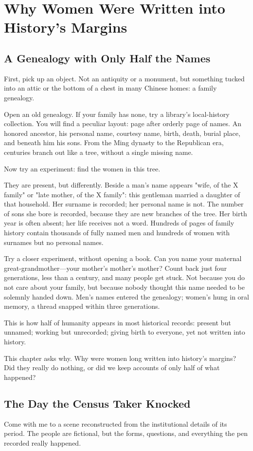 \chapter[Women in History's Margins]{Why Women Were Written into History's Margins}
\section{A Genealogy with Only Half the Names}
First, pick up an object. Not an antiquity or a monument, but something tucked into an attic or the bottom of a chest in many Chinese homes: a family genealogy.

Open an old genealogy. If your family has none, try a library's local-history collection. You will find a peculiar layout: page after orderly page of names. An honored ancestor, his personal name, courtesy name, birth, death, burial place, and beneath him his sons. From the Ming dynasty to the Republican era, centuries branch out like a tree, without a single missing name.

Now try an experiment: find the women in this tree.

They are present, but differently. Beside a man's name appears "wife, of the X family" or "late mother, of the X family": this gentleman married a daughter of that household. Her surname is recorded; her personal name is not. The number of sons she bore is recorded, because they are new branches of the tree. Her birth year is often absent; her life receives not a word. Hundreds of pages of family history contain thousands of fully named men and hundreds of women with surnames but no personal names.

Try a closer experiment, without opening a book. Can you name your maternal great-grandmother---your mother's mother's mother? Count back just four generations, less than a century, and many people get stuck. Not because you do not care about your family, but because nobody thought this name needed to be solemnly handed down. Men's names entered the genealogy; women's hung in oral memory, a thread snapped within three generations.

This is how half of humanity appears in most historical records: present but unnamed; working but unrecorded; giving birth to everyone, yet not written into history.

This chapter asks why. Why were women long written into history's margins? Did they really do nothing, or did we keep accounts of only half of what happened?

\section{The Day the Census Taker Knocked}
Come with me to a scene reconstructed from the institutional details of its period. The people are fictional, but the forms, questions, and everything the pen recorded really happened.

